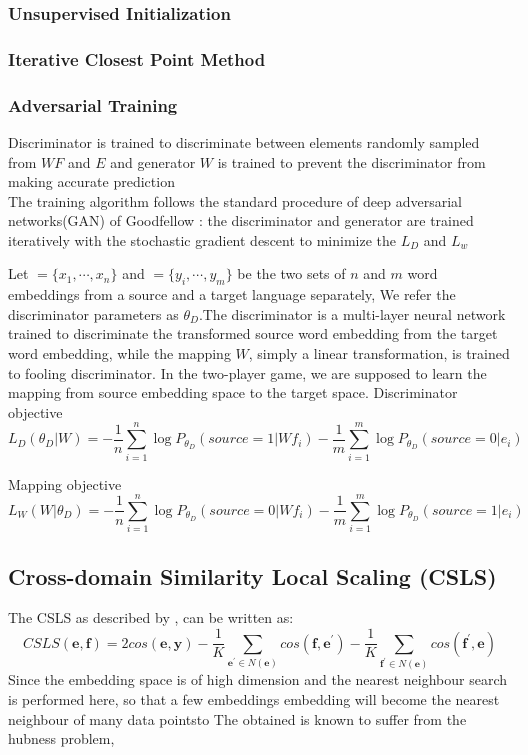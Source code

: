 	
	
	\subsubsection{Unsupervised Initialization}
	\subsubsection{Iterative Closest Point Method}
	\subsubsection{Adversarial Training} 
	Discriminator is trained to discriminate between elements randomly sampled from ${WF}$ and ${E}$ and generator ${W}$ is trained to prevent the discriminator from making accurate prediction\\
	
	The training algorithm follows the standard procedure of deep adversarial networks(GAN) of Goodfellow \cite{bibid}: the discriminator and generator are trained iteratively with the stochastic gradient descent to minimize the ${L_D}$ and ${L_w}$

	Let ${=\{ x_1, \cdots, x_n\}}$ and ${ = \{ y_i, \cdots , y_m\}}$ be the two sets of $n$ and $m$ word embeddings from a source and a target language separately, We refer the discriminator parameters as ${\theta_D}$.The discriminator is a multi-layer neural network trained to discriminate the transformed source word embedding from the target word embedding, while the mapping $W$, simply a linear transformation, is trained to fooling discriminator. In the two-player game, we are supposed to learn the mapping from source embedding space to the target space.
	Discriminator objective  
	\[ L_D(\theta_D | W) =  -\frac{1}{n} \sum_{i=1}^{n} \log P_{\theta_D}(source = 1| Wf_i) - \frac{1}{m} \sum_{i=1}^{m} \log P_{\theta_D}(source=0| e_i) \]	
	
	Mapping objective 
	\[ L_W(W|\theta_D) =  -\frac{1}{n} \sum_{i=1}^{n}\log P_{\theta_D}(source=0|W f_i) - \frac{1}{m} \sum_{i=1}^{m} \log P_{\theta_D}(source = 1 | e_i) \]
	
	
	\subsection{Cross-domain Similarity Local Scaling (CSLS)}
	The CSLS as described by \cite{conneau2017word}, can be written as:
	\[ CSLS(\bm{e}, \bm{f}) = 2 cos(\bm{e}, \bm{y}) - \frac{1}{K} \sum_{\bm{e^{\prime}} \in N(\bm{e})} cos(\bm{f}, \bm{e^{\prime}})- \frac{1}{K} \sum_{\bm{f^{\prime}} \in N(\bm{e})} cos(\bm{f^{\prime}}, \bm{e}) \]
	Since the embedding space is of high dimension and the nearest neighbour search is performed here, so that a few embeddings embedding will become the nearest neighbour of many data pointsto The obtained is known to suffer from the hubness problem,
	

